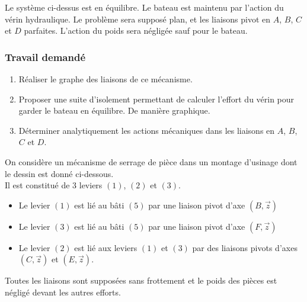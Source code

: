 Le système ci-dessus est en équilibre. Le bateau est maintenu par l'action du vérin hydraulique. Le problème sera supposé plan, et les liaisons pivot en $A$, $B$, $C$ et $D$ parfaites. L'action du poids sera négligée sauf
pour le bateau.

\subsubsection{Travail demandé}
\begin{enumerate}
\item Réaliser le graphe des liaisons de ce mécanisme.
\item Proposer une suite d'isolement permettant de calculer l’effort du vérin pour garder le bateau en équilibre. De manière graphique.
\item Déterminer analytiquement les actions mécaniques dans les liaisons en $A$, $B$, $C$ et $D$.
\end{enumerate}


\newpage



On considère un mécanisme de serrage de pièce dans un montage d’usinage dont le dessin est donné ci-dessous.\\
Il est constitué de $3$ leviers $(1)$, $(2)$ et $(3)$.

\begin{itemize}
\item Le levier $(1)$ est lié au bâti $(5)$ par une liaison pivot d’axe $(B,\overrightarrow{z})$
\item Le levier $(3)$ est lié au bâti $(5)$ par une liaison pivot d’axe $(F,\overrightarrow{z})$
\item Le levier $(2)$ est lié aux leviers $(1)$ et $(3)$ par des liaisons pivots d’axes $(C,\overrightarrow{z})$ et $(E,\overrightarrow{z})$.
\end{itemize}

Toutes les liaisons sont supposées sans frottement et le poids des pièces est négligé devant les autres efforts.

